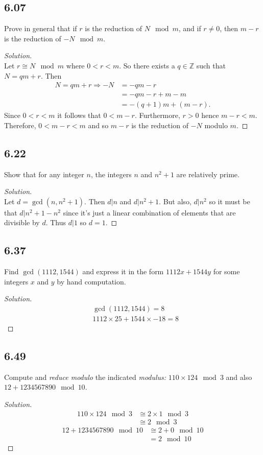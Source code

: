 \documentclass[]{article}
\newcommand\<{\langle}
\renewcommand\>{\rangle}
\newcommand{\ZZ}{\ensuremath{\mathbb{Z}}}
\newenvironment{solution}
{
	\begin{proof}[Solution] \text{ }
		\\
	}
	{
	\end{proof}
}
\begin{document}
\subsection*{6.07} Prove in general that if $r$ is the reduction of $N \mod m$, and if $r \neq 0$, then $m - r$ is the reduction of $-N \mod m$.
\begin{solution}
	Let $r \cong N \mod m$ where $0 < r < m$. So there exists a $q \in \ZZ$ such that $N = qm + r$. Then
	\begin{align*}
		N = qm + r \Rightarrow -N &= -qm - r \\
		&= -qm - r + m - m \\
		&= -(q + 1)m + (m - r).
	\end{align*}
	Since $0 < r < m$ it follows that $0 < m - r$. Furthermore, $r > 0$ hence $m - r < m$. Therefore, $0 < m - r < m$ and so $m - r$ is the reduction of $-N$ modulo $m$.
\end{solution}

\subsection*{6.22} Show that for any integer $n$, the integers $n$ and $n^2 + 1$ are relatively prime.
\begin{solution}
	Let $d = \gcd\left(n, n^2 + 1\right)$. Then $d | n$ and $d | n^2 + 1$. But also, $d | n^2$ so it must be that $d | n^2 + 1 - n^2$ since it's just a linear combination of elements that are divisible by $d$. Thus $d | 1$ so $d = 1$.
\end{solution}

\subsection*{6.37} Find $\gcd(1112, 1544)$ and express it in the form $1112x + 1544y$ for some integers $x$ and $y$ by hand computation.
\begin{solution}
	\begin{align*}
		&\gcd(1112, 1544) = 8 \\
		&1112 \times 25 + 1544 \times -18 = 8
	\end{align*}
\end{solution}

\subsection*{6.49} Compute and \textit{reduce modulo} the indicated \textit{modulus:} $110 \times 124 \mod 3$ and also $12 + 1234567890 \mod 10$.
\begin{solution}
	\begin{align*}
		110 \times 124 \mod 3 &\cong 2 \times 1 \mod 3 \\
		&\cong 2 \mod 3
	\end{align*}
	\begin{align*}
		12 + 1234567890 \mod 10 &\cong 2 + 0 \mod 10 \\
		&= 2 \mod 10
	\end{align*}
\end{solution}
\end{document}
